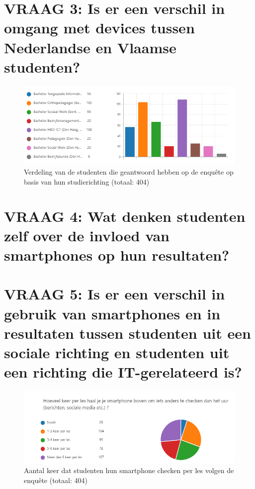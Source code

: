 \section{VRAAG 3: Is er een verschil in omgang met devices tussen Nederlandse en Vlaamse studenten?}
\label{sec:vlaanderen-nederland}

\begin{figure}
	\includegraphics[width=\textwidth]
	{img/verdeling-enquete-richting.png}
	\caption{Verdeling van de studenten die geantwoord hebben op de enquête op basis van hun studierichting (totaal: 404)}
	\label{fig:verdeling-enquete-richting}
\end{figure}

\section{VRAAG 4: Wat denken studenten zelf over de invloed van smartphones op hun resultaten?}
\label{sec:invloed-resultaten}


\section{VRAAG 5: Is er een verschil in gebruik van smartphones en in resultaten tussen studenten uit een sociale richting en studenten uit een richting die IT-gerelateerd is?}
\label{sec:sociale-it-richting}




\begin{figure}
	\includegraphics[width=\textwidth]
	{img/smartphone-social.png}
	\caption{Aantal keer dat studenten hun smartphone checken per les volgen de enquête (totaal: 404)}
	\label{fig:smartphone-social}
\end{figure}

